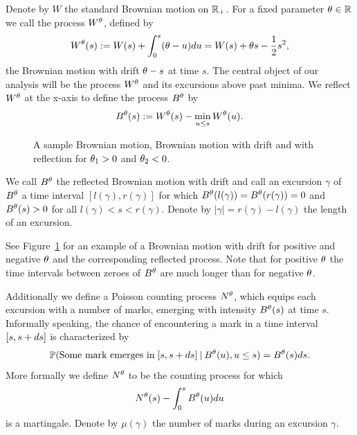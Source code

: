Denote by $W$ the standard Brownian motion on $\mathbb{R}_+$.\label{I: bm} 
For a fixed parameter $\theta \in \mathbb{R}$ we call the process $W^{\theta}$, defined by
\begin{equation} \label{D: Wt}
	W^{\theta}(s) := W(s) + \int_{0}^{s}(\theta - u)du = W(s) + \theta s - \frac{1}{2}s^2,
\end{equation}
the Brownian motion with drift $\theta -s$ at time $s$.
The central object of our analysis will be the process $W^{\theta}$ and its excursions above past minima.
We reflect $W^{\theta}$ at the x-axis to define the process $B^{\theta}$ by
\begin{equation} \label{D: Bt}
	B^{\theta}(s) := W^{\theta}(s) - \min_{u \leq s}W^{\theta}(u).
\end{equation}

\begin{figure}[h]%
	\centering
	\subfloat[$W(s)$]{}%
	\quad
	\subfloat[$W^{\pp_1}(s)$]{}%
	\quad
	\subfloat[$B^{\pp_1}(s)$]{}%
	\quad
	\subfloat[$W^{\pp_2}(s)$]{}%
	\quad
	\subfloat[$B^{\pp_2}(s)$]{}%
	\caption{A sample Brownian motion, Brownian motion with drift and with reflection for $\theta_1>0$ and $\theta_2<0$.}%
	\label{F: BM}%
\end{figure}

We call $B^{\theta}$ the reflected Brownian motion with drift
and call an excursion $\gamma$ of $B^{\theta}$ a time interval $[l(\gamma), r(\gamma)]$ for which $B^{\theta}(l(\gamma)) = B^{\theta}(r(\gamma)) = 0$
and $B^{\theta}(s) > 0$ for all $l(\gamma) < s < r(\gamma)$. \label{I: gamma}
Denote by $|\gamma| = r(\gamma) - l(\gamma)$ the length of an excursion. \label{I: rgammalgamma}

See Figure~\ref{F: BM} for an example of a Brownian motion with drift for positive and negative $\theta$ and the corresponding reflected process.
Note that for positive $\theta$ the time intervals between zeroes of $B^{\theta}$ are much longer than for negative $\theta$.

Additionally we define a Poisson counting process $N^{\theta}$, \label{I: nt} 
which equips each excursion with a number of marks,
emerging with intensity $B^{\theta}(s)$ at time $s$.
Informally speaking, the chance of encountering a mark in a time interval $[s, s+ds]$ is characterized by
\begin{equation*}
	\mathbb{P}( \text{Some mark emerges in} \; [s, s+ds] \: | \: B^{\theta}(u), u \leq s ) = B^{\theta}(s)ds.
\end{equation*}
More formally we define $N^{\theta}$ to be the counting process for which
\begin{equation*}
	N^{\theta}(s) - \int_{0}^{s} B^{\theta}(u)du
\end{equation*}
is a martingale.
Denote by $\mu(\gamma)$ the number of marks during an excursion $\gamma$. \label{I: mugamma}

